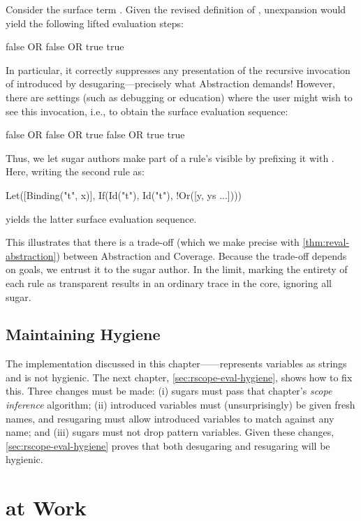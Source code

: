 Consider the surface term . 
Given the revised definition of , unexpansion would yield the
following lifted evaluation steps:
\begin{Codes}
    false OR false OR true
\SurfStep true
\end{Codes}
In particular, it correctly suppresses any presentation of the recursive
invocation of 
introduced by desugaring---precisely what Abstraction demands!
However, there are settings
(such as debugging or education) where the user might wish to see this
invocation, i.e., to obtain the surface evaluation sequence:
\begin{Codes}
    false OR false OR true
\SurfStep false OR true
\SurfStep true
\end{Codes}
Thus, we let sugar authors make part of a rule's 
visible by prefixing it with \Code{!}. Here, writing the second
 rule as:
\begin{Codes}
Let([Binding("t", x)],
    If(Id("t"), Id("t"), !Or([y, ys ...])))
\end{Codes}
yields the latter surface evaluation sequence.

This illustrates that there is a trade-off (which we make precise with
\cref{thm:reval-abstraction}) between Abstraction and Coverage.
Because the trade-off depends on
goals, we entrust it to the sugar author.  In the limit,
marking the entirety of each rule as transparent results in
an ordinary trace in the core, ignoring all sugar.

\subsection{Maintaining Hygiene}

The implementation discussed in this
chapter---{\Resugarer}---represents variables as strings and is not
hygienic. The next chapter, \cref{sec:rscope-eval-hygiene}, shows how
to fix this. Three changes must be made: (i) sugars must pass that
chapter's \emph{scope inference} algorithm; (ii) introduced variables
must (unsurprisingly) be given fresh names, and resugaring must allow
introduced variables to match against any name; and (iii) sugars must
not drop pattern variables. Given these changes,
\cref{sec:rscope-eval-hygiene} proves that both desugaring and
resugaring will be hygienic.

\section{{\Resugarer} at Work}
\label{sec:reval-pyret-example}


